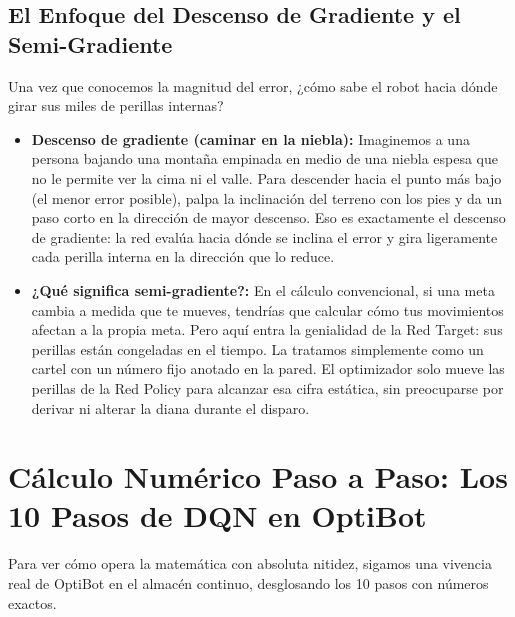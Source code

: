 \subsection{El Enfoque del Descenso de Gradiente y el Semi-Gradiente}
Una vez que conocemos la magnitud del error, ¿cómo sabe el robot hacia dónde girar sus miles de perillas internas?

\begin{itemize}
  \item \textbf{Descenso de gradiente (caminar en la niebla):} Imaginemos a una persona bajando una montaña empinada en medio de una niebla espesa que no le permite ver la cima ni el valle. Para descender hacia el punto más bajo (el menor error posible), palpa la inclinación del terreno con los pies y da un paso corto en la dirección de mayor descenso. Eso es exactamente el descenso de gradiente: la red evalúa hacia dónde se inclina el error y gira ligeramente cada perilla interna en la dirección que lo reduce.
  \item \textbf{¿Qué significa semi-gradiente?:} En el cálculo convencional, si una meta cambia a medida que te mueves, tendrías que calcular cómo tus movimientos afectan a la propia meta. Pero aquí entra la genialidad de la Red Target: sus perillas están congeladas en el tiempo. La tratamos simplemente como un cartel con un número fijo anotado en la pared. El optimizador solo mueve las perillas de la Red Policy para alcanzar esa cifra estática, sin preocuparse por derivar ni alterar la diana durante el disparo.
\end{itemize}

\section{Cálculo Numérico Paso a Paso: Los 10 Pasos de DQN en OptiBot}
Para ver cómo opera la matemática con absoluta nitidez, sigamos una vivencia real de OptiBot en el almacén continuo, desglosando los 10 pasos con números exactos.

